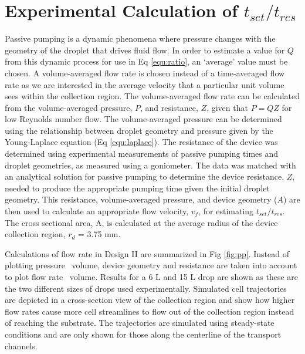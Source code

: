 \section{Experimental Calculation of \texorpdfstring{{\boldmath$t_{set}/t_{res}$}}{tset tres}}

Passive pumping is a dynamic phenomena where pressure changes with the geometry of the droplet that drives fluid flow. In order to estimate a value for $Q$ from this dynamic process for use in Eq \ref{equ:ratio}, an `average' value must be chosen.  A volume-averaged flow rate is chosen instead of a time-averaged flow rate as we are interested in the average velocity that a particular unit volume sees within the collection region. The volume-averaged flow rate can be calculated from the volume-averaged pressure, $P$, and resistance, $Z$, given that $P=QZ$ for low Reynolds number flow. The volume-averaged pressure can be determined using the relationship between droplet geometry and pressure given by the Young-Laplace equation (Eq \ref{equ:laplace}). The resistance of the device was determined using experimental measurements of passive pumping times and droplet geometries, as measured using a goniometer. The data was matched with an analytical solution for passive pumping\cite{Berthier:2007mi} to determine the device resistance, $Z$, needed to produce the appropriate pumping time given the initial droplet geometry. This resistance, volume-averaged pressure, and device geometry ($A$) are then used to calculate an appropriate flow velocity, $v_{f}$, for estimating $t_{set}/t_{res}$. The cross sectional area, A, is calculated at the average radius of the device collection region, $r_{d}$ = 3.75 mm. 

Calculations of flow rate in Design II are summarized in Fig \ref{fig:pp}. Instead of plotting pressure \vs\ volume, device geometry and resistance are taken into account to plot flow rate \vs\ volume. Results for a 6 \textmu L and 15 \textmu L drop are shown as these are the two different sizes of drops used experimentally. Simulated cell trajectories are depicted in a cross-section view of the collection region and show how higher flow rates cause more cell streamlines to flow out of the collection region instead of reaching the substrate. The trajectories are simulated using steady-state conditions and are only shown for those along the centerline of the transport channels.
